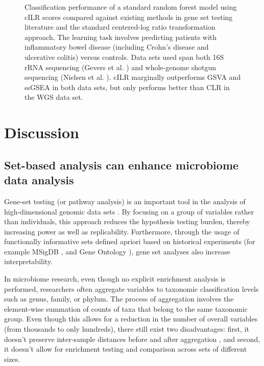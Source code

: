 \documentclass[10pt,letterpaper]{article}
\begin{document}
\begin{figure}
    \caption{Classification performance of a standard random forest model using cILR scores compared against existing methods in gene set testing literature and the standard centered-log ratio transformation approach. The learning task involves predicting patients with inflammatory bowel disease (including Crohn's disease and ulcerative colitis) versus controls. Data sets used span both 16S rRNA sequencing (Gevers et al. \cite{gevers2014}) and whole-genome shotgun sequencing (Nielsen et al. \cite{nielsen2014}). cILR marginally outperforms GSVA and ssGSEA in both data sets, but only performs better than CLR in the WGS data set.}
    \label{fig:pred_data}
\end{figure}

\section*{Discussion}
\subsection*{Set-based analysis can enhance microbiome data analysis}
Gene-set testing (or pathway analysis) is an important tool in the analysis of high-dimensional genomic data sets \cite{khatri2012}. By focusing on a group of variables rather than individuals, this approach reduces the hypothesis testing burden, thereby increasing power as well as replicability. Furthermore, through the usage of functionally informative sets defined apriori based on historical experiments (for example MSigDB \cite{subramanian2005}, and Gene Ontology \cite{ashburner2000}), gene set analyses also increase interpretability.  

In microbiome research, even though no explicit enrichment analysis is performed, researchers often aggregate variables to taxonomic classification levels such as genus, family, or phylum. The process of aggregation involves the element-wise summation of counts of taxa that belong to the same taxonomic group. Even though this allows for a reduction in the number of overall variables (from thousands to only hundreds), there still exist two disadvantages: first, it doesn't preserve inter-sample distances before and after aggregation \cite{egozcue2005}, and second, it doesn't allow for enrichment testing and comparison across sets of different sizes.   
\end{document}
